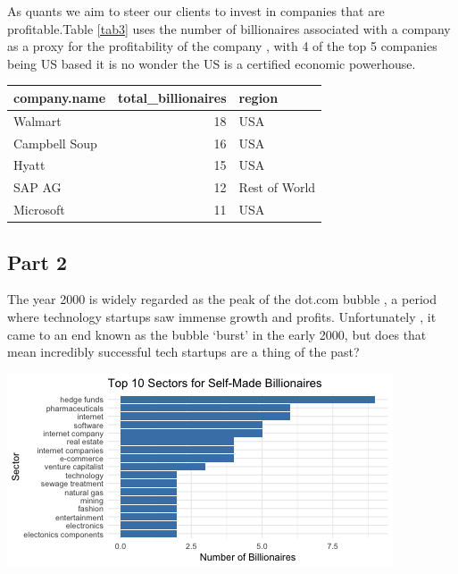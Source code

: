 \documentclass[11pt,preprint]{elsarticle}
\let\origfigure\figure
\let\endorigfigure\endfigure
\renewenvironment{figure}[1][2] {
    \expandafter\origfigure\expandafter[H]
} {
    \endorigfigure
}
\let\origtable\table
\let\endorigtable\endtable
\renewenvironment{table}[1][2] {
    \expandafter\origtable\expandafter[H]
} {
    \endorigtable
}
\numberwithin{equation}{section}
\numberwithin{figure}{section}
\numberwithin{table}{section}
\begin{document}
\newpage

As quants we aim to steer our clients to invest in companies that are
profitable.Table \ref{tab3} uses the number of billionaires associated
with a company as a proxy for the profitability of the company , with 4
of the top 5 companies being US based it is no wonder the US is a
certified economic powerhouse.

\begin{table}[ht]
\centering
\begin{tabular}{lrl}
  \hline
company.name & total\_billionaires & region \\ 
  \hline
Walmart &  18 & USA \\ 
  Campbell Soup &  16 & USA \\ 
  Hyatt &  15 & USA \\ 
  SAP AG &  12 & Rest of World \\ 
  Microsoft &  11 & USA \\ 
   \hline
\end{tabular}
\caption{Companies With Most Billionaires \label{tab3}} 
\end{table}

\subsection{Part 2}\label{part-2}

The year 2000 is widely regarded as the peak of the dot.com bubble , a
period where technology startups saw immense growth and profits.
Unfortunately , it came to an end known as the bubble `burst' in the
early 2000, but does that mean incredibly successful tech startups are a
thing of the past?

\begin{figure}[H]

{\centering \includegraphics{Question4_files/figure-latex/Figure2-1} 

}

\caption{Companies founded Since 2000 \label{Figure2}}\label{fig:Figure2}
\end{figure}
\end{document}
